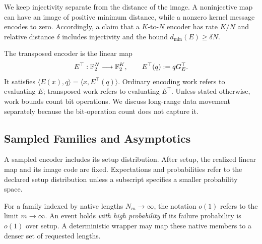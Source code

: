 We keep injectivity separate from the distance of the image. A noninjective
map can have an image of positive minimum distance, while a nonzero kernel
message encodes to zero. Accordingly, a claim that a $K$-to-$N$ encoder has
rate $K/N$ and relative distance $\delta$ includes injectivity and the bound
$d_{\min}(E)\ge\delta N$.

The transposed encoder is the linear map
\[
  E^\top:\mathbb F_2^N\longrightarrow\mathbb F_2^K,
  \qquad
  E^\top(q):=qG_E^\top.
\]
It satisfies $\langle E(x),q\rangle=\langle x,E^\top(q)\rangle$. Ordinary
encoding work refers to evaluating $E$; transposed work refers to evaluating
$E^\top$. Unless stated otherwise, work bounds count bit operations. We discuss
long-range data movement separately because the bit-operation count does not
capture it.

\subsection{Sampled Families and Asymptotics}

A sampled encoder includes its setup distribution. After setup, the realized
linear map and its image code are fixed. Expectations and probabilities refer
to the declared setup distribution unless a subscript specifies a smaller
probability space.

For a family indexed by native lengths $N_m\to\infty$, the notation $o(1)$
refers to the limit $m\to\infty$. An event holds \emph{with high probability}
if its failure probability is $o(1)$ over setup. A deterministic wrapper may
map these native members to a denser set of requested lengths.
